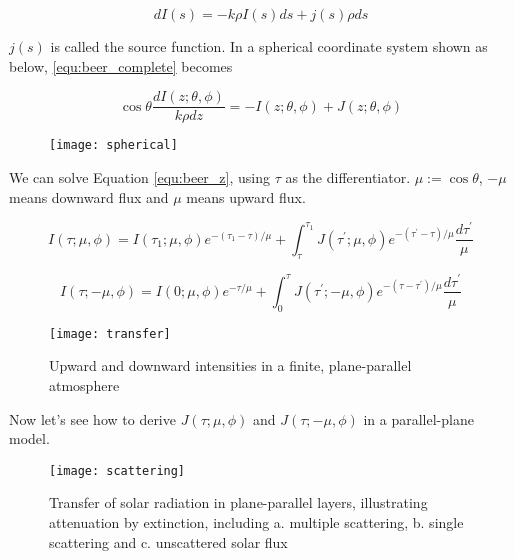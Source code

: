 \begin{appendices}
\begin{equation}
    dI(s) = -k\rho I(s) ds + j(s) \rho ds
    \label{equ:beer_complete}
\end{equation}

$j(s)$ is called the source function. In a spherical coordinate system shown as below, \eqref{equ:beer_complete} becomes

\begin{equation}
    \cos \theta \frac{dI(z;\theta, \phi)}{k\rho dz} = -I(z;\theta, \phi) + J(z;\theta, \phi)
    \label{equ:beer_z}
\end{equation}

\begin{figure}[h!]
    \centering
    \texttt{[image: spherical]}
\end{figure}

We can solve Equation \eqref{equ:beer_z}, using $\tau$ as the differentiator. $\mu:=\cos \theta$, $-\mu$ means downward flux and $\mu$ means upward flux.

\begin{equation}
    I(\tau; \mu, \phi) = I(\tau_1; \mu, \phi) e^{-(\tau_1 - \tau)/\mu} + \int_{\tau}^{\tau_1} J(\tau^\prime;\mu,\phi)e^{-(\tau^\prime - \tau)/\mu} \frac{d\tau^\prime}{\mu}
    \label{equ:upwward}
\end{equation}

\begin{equation}
I(\tau; -\mu, \phi) = I(0; \mu, \phi) e^{-\tau/\mu} + \int_{0}^{\tau} J(\tau^\prime;-\mu,\phi)e^{-(\tau - \tau^\prime)/\mu} \frac{d\tau^\prime}{\mu}
\label{equ:downward}
\end{equation}

\begin{figure}[h!]
    \centering
    \texttt{[image: transfer]}
    \caption{Upward and downward intensities in a finite, plane-parallel atmosphere}
\end{figure}

Now let's see how to derive $J(\tau;\mu,\phi)$ and $J(\tau;-\mu,\phi)$ in a parallel-plane model.

\begin{figure}[h!]
    \centering
    \texttt{[image: scattering]}
    \caption{Transfer of solar radiation in plane-parallel layers, illustrating attenuation by extinction, including a. multiple scattering, b. single scattering and c. unscattered solar flux}
\end{figure}


\end{appendices}
